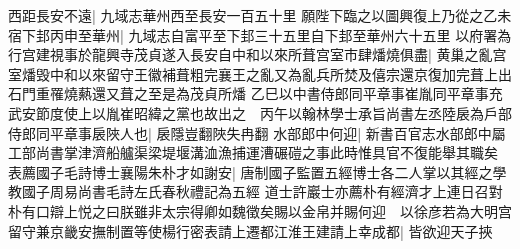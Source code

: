 西距長安不遠|{
	九域志華州西至長安一百五十里}
願陛下臨之以圖興復上乃從之乙未宿下邽丙申至華州|{
	九域志自富平至下邽三十五里自下邽至華州六十五里}
以府署為行宫建視事於龍興寺茂貞遂入長安自中和以來所葺宫室市肆燔燒俱盡|{
	黄巢之亂宫室燔毁中和以來留守王徽補葺粗完襄王之亂又為亂兵所焚及僖宗還京復加完葺上出石門重罹燒爇還又葺之至是為茂貞所燔}
乙巳以中書侍郎同平章事崔胤同平章事充武安節度使上以胤崔昭緯之黨也故出之　丙午以翰林學士承旨尚書左丞陸扆為戶部侍郎同平章事扆陜人也|{
	扆隱豈翻陜失冉翻}
水部郎中何迎|{
	新書百官志水部郎中屬工部尚書掌津濟船艫渠梁堤堰溝洫漁捕運漕碾磑之事此時惟具官不復能舉其職矣}
表薦國子毛詩博士襄陽朱朴才如謝安|{
	唐制國子監置五經博士各二人掌以其經之學教國子周易尚書毛詩左氏春秋禮記為五經}
道士許巖士亦薦朴有經濟才上連日召對朴有口辯上悦之曰朕雖非太宗得卿如魏徵矣賜以金帛并賜何迎　以徐彦若為大明宫留守兼京畿安撫制置等使楊行密表請上遷都江淮王建請上幸成都|{
	皆欲迎天子挾}


